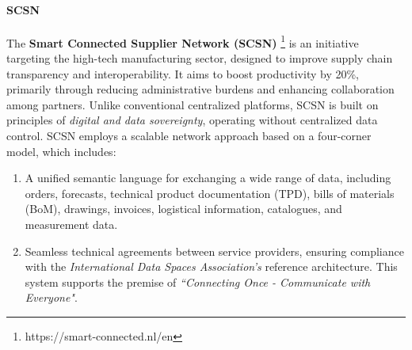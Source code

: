 \paragraph{SCSN}
The \textbf{Smart Connected Supplier Network (SCSN)} \footnote{https://smart-connected.nl/en} is an initiative targeting the high-tech manufacturing sector, designed to improve supply chain transparency and interoperability. It aims to boost productivity by 20\%, primarily through reducing administrative burdens and enhancing collaboration among partners. Unlike conventional centralized platforms, SCSN is built on principles of \textit{digital and data sovereignty}, operating without centralized data control. SCSN employs a scalable network approach based on a four-corner model, which includes:
\begin{enumerate}
    \item A unified semantic language for exchanging a wide range of data, including orders, forecasts, technical product documentation (TPD), bills of materials (BoM), drawings, invoices, logistical information, catalogues, and measurement data.
    \item Seamless technical agreements between service providers, ensuring compliance with the \textit{International Data Spaces Association's} reference architecture. This system supports the premise of \textit{``Connecting Once - Communicate with Everyone"}.
\end{enumerate}


